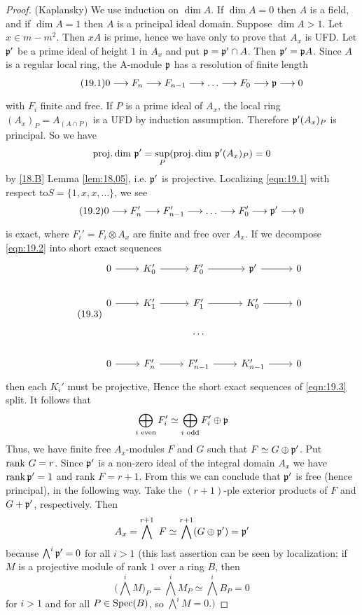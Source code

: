\documentclass[../main]{subfiles}
\begin{document}
\begin{proof}(Kaplansky) We use induction on $\dim A$. If $\dim A=0$ then $A$ is a field, and if $\dim A=1$ then $A$ is a principal ideal domain. Suppose $\dim A>1$. Let $x \in m-m^2$. Then $xA$ is prime, hence we have only to prove that $A_x$ is UFD. Let $\mathfrak{p}'$ be a prime ideal of height $1$ in $A_x$ and put $\mathfrak{p}=\mathfrak{p}' \cap A$. Then $\mathfrak{p}'=\mathfrak{p} A$. Since $A$ is a regular local ring, the A-module $\mathfrak{p}$ has a resolution of finite length \[\tag{19.1}\label{eqn:19.1} 0\varrightarrow{} F_n\varrightarrow{}F_{n-1}\varrightarrow{} \dots \varrightarrow{}F_0 \varrightarrow{} \ideal{p}\varrightarrow{} 0\] with $F_i$ finite and free. If $P$ is a prime ideal of $A_x$, the local ring $(A_x)_P= A_{(A\cap P)}$ is a UFD by induction assumption. Therefore $\mathfrak{p}'(A_x)_P$ is principal. So we have \[\operatorname{proj. dim} \, \mathfrak{p}' = \sup_P (\operatorname{proj. dim}\, \mathfrak{p}'(A_x)_P)=0 \] by \ref{18.B} Lemma \ref{lem:18.05}, i.e. $\mathfrak{p}'$ is projective. Localizing \ref{eqn:19.1} with respect to\newline $S=\{1, x, x,\dots \}$, we see \[\tag{19.2}\label{eqn:19.2} 0\varrightarrow{} F_n' \varrightarrow{} F_{n-1}' \varrightarrow{} \dots \varrightarrow{}F_0' \varrightarrow{}\ideal{p}' \varrightarrow{} 0\] is exact, where $F_i'=F_i \otimes A_x$ are finite and free over $A_x$. If we decompose \ref{eqn:19.2} into short exact sequences
\[\tag{19.3}\label{eqn:19.3} \begin{tikzcd}
0 \arrow[r]& K_0' \arrow[r]& F_0' \arrow[r] &\ideal{p}' \arrow[r]& 0\\
0 \arrow[r]& K_1' \arrow[r]& F_1' \arrow[r] &K_0' \arrow[r]& 0\\
 && \dots &&\\
0 \arrow[r]& F_n' \arrow[r]& F_{n-1}' \arrow[r] & K_{n-1}' \arrow[r]& 0
\end{tikzcd}
\]
then each $K_i'$ must be projective, Hence the short exact sequences of \ref{eqn:19.3} split. It follows that
\[\bigoplus_{i\text{ even}} F_i' \simeq \bigoplus_{i\text{ odd}} F_i'\oplus \mathfrak{p}\]
Thus, we have finite free $A_x$-modules $F$ and $G$ such that $F \simeq G \oplus \mathfrak{p}'$. Put $\operatorname{rank}\, G = r$. Since $\mathfrak{p}' $ is a non-zero ideal of the integral domain $A_x$ we have $\operatorname{rank} \mathfrak{p}'=1$ and rank $F=r+1$. From this we can conclude that $\mathfrak{p}'$ is free (hence principal), in the following way. Take the $(r+1)$-ple exterior products of $F$ and $G+\mathfrak{p}'$, respectively. Then
\[
A_x=\bigwedge^{r+1} ~F \simeq \bigwedge^{r+1}(G \oplus \mathfrak{p}')=\mathfrak{p}'
\]
because $\bigwedge^i \mathfrak{p}'=0$ for all $i>1$ (this last assertion can be seen by localization: if $M$ is a projective module of rank $1$ over a ring $B$, then \[\Big(\bigwedge^iM\Big)_P=\bigwedge^i M_P \simeq \bigwedge^i B_P=0\] for $i>1$ and for all $P \in \operatorname{Spec}(B)$, so $\bigwedge^i M=0 .)$
\end{proof}
\end{document}
